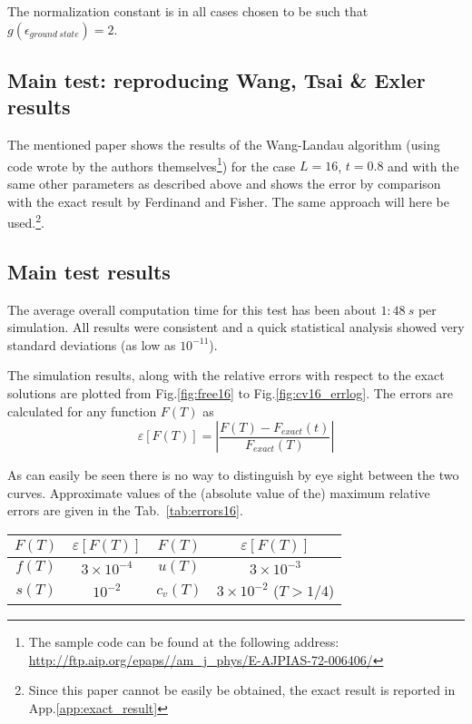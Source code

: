 \documentclass[11pt]{article}
\newcommand{\figname}{Fig.}
\newcommand{\tabname}{Tab.~}
\newcommand{\appname}{App.}
\begin{document}
The normalization constant is in all cases chosen to be such that $g(\epsilon_{ground~state}) = 2$.

\subsection*{Main test: reproducing Wang, Tsai \& Exler results}

The mentioned paper shows the results of the Wang-Landau algorithm (using code wrote by the authors themselves\footnote{The sample code can be found at the following address: \url{http://ftp.aip.org/epaps//am_j_phys/E-AJPIAS-72-006406/}}) for the case $L=16$, $t=0.8$ and with the same other parameters as described above and shows the error by comparison with the exact result by Ferdinand and Fisher\cite{bib:exact}. The same approach will here be used.\footnote{Since this paper cannot be easily be obtained, the exact result is reported in \appname \ref{app:exact_result}}.



\subsection*{Main test results}

The average overall computation time for this test has been about $1:48~s$ per simulation. All results were consistent and a quick statistical analysis showed very standard deviations (as low as $10^{-11}$).

The simulation results, along with the relative errors with respect to the exact solutions are plotted from \figname \ref{fig:free16} to \figname \ref{fig:cv16_errlog}. The errors are calculated for any function $F(T)$ as
\[
	\varepsilon[F(T)] = \left\lvert\frac{F(T) - F_{exact}(t)}{F_{exact}(T)}\right\rvert
\]

As can easily be seen there is no way to distinguish by eye sight between the two curves. Approximate values of the (absolute value of the) maximum relative errors are given in the \tabname \ref{tab:errors16}.

\begin{center}
\label{tab:errors16}
\begin{tabular}{cccc}
\toprule
$F(T)$	&	$\varepsilon[F(T)]$	&	$F(T)$		&	$\varepsilon[F(T)]$				\\
\midrule
$f(T)$	&	$3 \times 10^{-4}$	&	$u(T)$		&	$3 \times 10^{-3}$						\\
$s(T)$	&	$10^{-2}$			&	$c_v(T)$	&	$3 \times 10^{-2}$ ($T > 1/4$)		\\
\bottomrule
\end{tabular}
\end{center}
\end{document}
